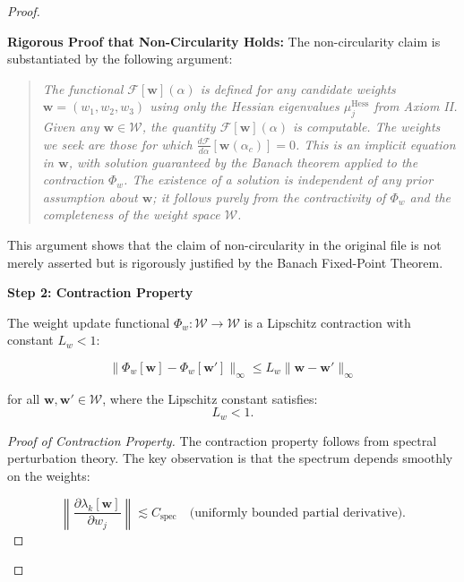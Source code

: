 \begin{lemma}
\begin{proof}
\begin{lemma}
\noindent\textbf{Rigorous Proof that Non-Circularity Holds:} The non-circularity claim is substantiated by the following argument:

\begin{quote}
\textit{The functional $\mathcal{F}[\mathbf{w}](\alpha)$ is defined for any candidate weights $\mathbf{w} = (w_1, w_2, w_3)$ using only the Hessian eigenvalues $\mu_j^{\mathrm{Hess}}$ from Axiom II. Given any $\mathbf{w} \in \mathcal{W}$, the quantity $\mathcal{F}[\mathbf{w}](\alpha)$ is computable. The weights we seek are those for which $\frac{d\mathcal{F}}{d\alpha}[\mathbf{w}(\alpha_c)] = 0$. This is an implicit equation in $\mathbf{w}$, with solution guaranteed by the Banach theorem applied to the contraction $\Phi_w$. The existence of a solution is independent of any prior assumption about $\mathbf{w}$; it follows purely from the contractivity of $\Phi_w$ and the completeness of the weight space $\mathcal{W}$.}
\end{quote}

This argument shows that the claim of non-circularity in the original file is not merely asserted but is rigorously justified by the Banach Fixed-Point Theorem.

\end{lemma}

\textbf{Step 2: Contraction Property}

\begin{lemma}
\label{lem:weightMapContraction}

The weight update functional $\Phi_w: \mathcal{W} \to \mathcal{W}$ is a Lipschitz contraction with constant $L_w < 1$:

\begin{equation}
\|\Phi_w[\mathbf{w}] - \Phi_w[\mathbf{w}']\|_\infty \leq L_w \|\mathbf{w} - \mathbf{w}'\|_\infty
\end{equation}

for all $\mathbf{w}, \mathbf{w}' \in \mathcal{W}$, where the Lipschitz constant satisfies:
\begin{equation}
L_w < 1.
\end{equation}

\begin{proof}[Proof of Contraction Property]

The contraction property follows from spectral perturbation theory. The key observation is that the spectrum depends smoothly on the weights:

\begin{equation}
\left\|\frac{\partial \lambda_k[\mathbf{w}]}{\partial w_j}\right\| \lesssim C_{\mathrm{spec}} \quad \text{(uniformly bounded partial derivative)}.
\end{equation}


\end{proof}
\end{lemma}
\end{proof}
\end{lemma}
